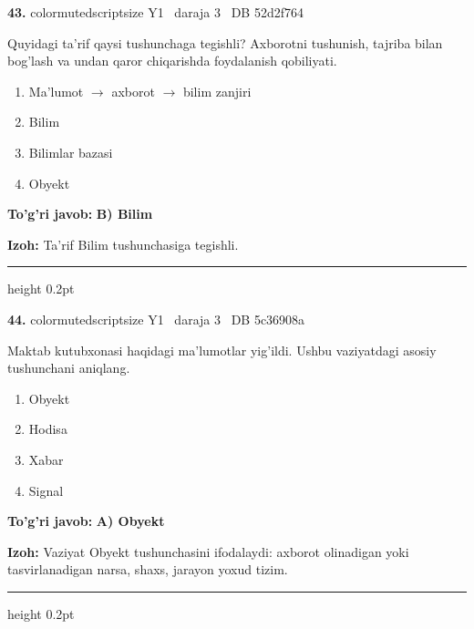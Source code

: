\documentclass[10pt,a4paper,oneside]{article}
\begin{document}
\noindent\textbf{\color{ink}43.}  {color{muted}scriptsize Y1 \textbullet\ daraja 3 \textbullet\ DB 52d2f764}
\par
Quyidagi ta'rif qaysi tushunchaga tegishli? Axborotni tushunish, tajriba bilan bog'lash va undan qaror chiqarishda foydalanish qobiliyati.
\begin{enumerate}[label=\Alph*),leftmargin=9mm]
\item Ma'lumot \ensuremath{\to} axborot \ensuremath{\to} bilim zanjiri
\item Bilim
\item Bilimlar bazasi
\item Obyekt
\end{enumerate}
\begin{tcolorbox}[enhanced,breakable,colback=teal!4,colframe=teal!50!black,boxrule=0.5pt,arc=1.1mm,left=3mm,right=3mm,top=1.7mm,bottom=1.7mm,before skip=2mm,after skip=2mm]
\textbf{\color{teal}To'g'ri javob:} \textbf{B) Bilim}
\par\smallskip
\textbf{Izoh:} Ta'rif Bilim tushunchasiga tegishli.
\end{tcolorbox}
\vspace{2mm}\hrule height 0.2pt \vspace{3mm}

\noindent\textbf{\color{ink}44.}  {color{muted}scriptsize Y1 \textbullet\ daraja 3 \textbullet\ DB 5c36908a}
\par
Maktab kutubxonasi haqidagi ma'lumotlar yig'ildi. Ushbu vaziyatdagi asosiy tushunchani aniqlang.
\begin{enumerate}[label=\Alph*),leftmargin=9mm]
\item Obyekt
\item Hodisa
\item Xabar
\item Signal
\end{enumerate}
\begin{tcolorbox}[enhanced,breakable,colback=teal!4,colframe=teal!50!black,boxrule=0.5pt,arc=1.1mm,left=3mm,right=3mm,top=1.7mm,bottom=1.7mm,before skip=2mm,after skip=2mm]
\textbf{\color{teal}To'g'ri javob:} \textbf{A) Obyekt}
\par\smallskip
\textbf{Izoh:} Vaziyat Obyekt tushunchasini ifodalaydi: axborot olinadigan yoki tasvirlanadigan narsa, shaxs, jarayon yoxud tizim.
\end{tcolorbox}
\vspace{2mm}\hrule height 0.2pt \vspace{3mm}
\end{document}
